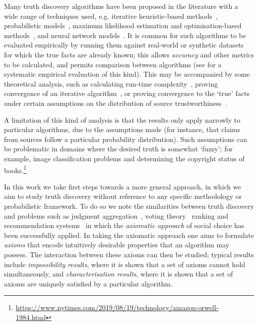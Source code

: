 Many truth discovery algorithms have been proposed in the literature with a
wide range of techniques used, e.g. iterative heuristic-based
methods~\cite{pasternack2010,galland2010}, probabilistic models~\cite{yin2008},
maximum likelihood estimation and optimisation-based methods~\cite{li2016}, and
neural network
models~\cite{kotonya2020explainable,marshall2017neural,wang2018eann}. It is
common for such algorithms to be evaluated empirically by running them against
real-world or synthetic datasets for which the true facts are already known;
this allows \emph{accuracy} and other metrics to be calculated, and permits
comparison between algorithms (see \cite{waguih2014truth} for a systematic
empirical evaluation of this kind). This may be accompanied by some theoretical
analysis, such as calculating run-time complexity~\cite{gupta2011survey},
proving convergence of an iterative algorithm~\cite{yin_supervised_2011}, or
proving convergence to the `true' facts under certain assumptions on the
distribution of source
trustworthiness~\cite{xiao2016,xiao_thesis2018,ghosh_2011}.

A limitation of this kind of analysis is that the results only apply narrowly
to particular algorithms, due to the assumptions made (for instance, that
claims from sources follow a particular probability distribution). Such
assumptions can be problematic in domains where the desired truth is somewhat
`fuzzy'; for example, image classification problems and determining the
copyright status of
books.\footnote{\url{https://www.nytimes.com/2019/08/19/technology/amazon-orwell-1984.html}}

In this work we take first steps towards a more general approach, in which we
aim to study truth discovery
without reference to any specific methodology or probabilistic framework. To do
so we note the similarities between truth discovery and problems such as
judgment aggregation~\cite{endriss2016ja}, voting
theory~\cite{zwicker2016voting} ranking and recommendation
systems~\cite{altman2008,altman2005ranking,andersen2008,tennenholtz2004} in
which the \emph{axiomatic approach} of social choice has been successfully
applied.
%
In taking the axiomatic approach one aims to formulate \emph{axioms} that
encode intuitively desirable properties that an algorithm may possess. The
interaction between these axioms can then be studied; typical results include
\emph{impossibility results}, where it is shown that a set of axioms cannot
hold simultaneously, and \emph{characterisation results}, where it is shown
that a set of axioms are uniquely satisfied by a particular algorithm.


